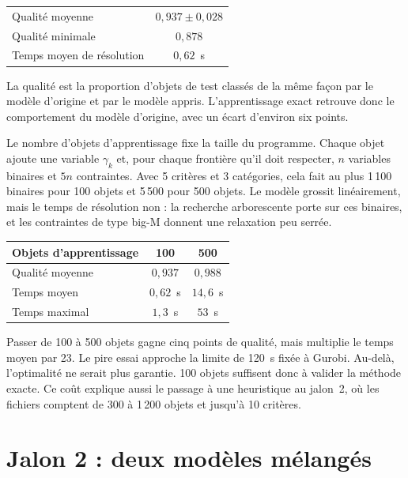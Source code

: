 \documentclass[11pt,a4paper]{article}
\begin{document}
\begin{center}
\begin{tabular}{lc}
\toprule
Qualité moyenne & $0{,}937 \pm 0{,}028$ \\
Qualité minimale & $0{,}878$ \\
Temps moyen de résolution & $0{,}62$~s \\
\bottomrule
\end{tabular}
\end{center}

La qualité est la proportion d'objets de test classés de la même façon par le modèle d'origine et par le modèle appris. L'apprentissage exact retrouve donc le comportement du modèle d'origine, avec un écart d'environ six points.

Le nombre d'objets d'apprentissage fixe la taille du programme. Chaque objet ajoute une variable $\gamma_k$ et, pour chaque frontière qu'il doit respecter, $n$ variables binaires et $5n$ contraintes. Avec 5 critères et 3 catégories, cela fait au plus 1\,100 binaires pour 100 objets et 5\,500 pour 500 objets. Le modèle grossit linéairement, mais le temps de résolution non : la recherche arborescente porte sur ces binaires, et les contraintes de type big-M donnent une relaxation peu serrée.

\begin{center}
\begin{tabular}{lcc}
\toprule
Objets d'apprentissage & 100 & 500 \\
\midrule
Qualité moyenne & $0{,}937$ & $0{,}988$ \\
Temps moyen & $0{,}62$~s & $14{,}6$~s \\
Temps maximal & $1{,}3$~s & $53$~s \\
\bottomrule
\end{tabular}
\end{center}

Passer de 100 à 500 objets gagne cinq points de qualité, mais multiplie le temps moyen par 23. Le pire essai approche la limite de 120~s fixée à Gurobi. Au-delà, l'optimalité ne serait plus garantie. 100 objets suffisent donc à valider la méthode exacte. Ce coût explique aussi le passage à une heuristique au jalon~2, où les fichiers comptent de 300 à 1\,200 objets et jusqu'à 10 critères.

\section{Jalon 2 : deux modèles mélangés}
\end{document}
